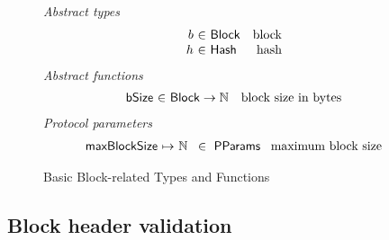 \documentclass[11pt,a4paper]{article}
\newcommand{\fun}[1]{\mathsf{#1}}
\newcommand{\type}[1]{\mathsf{#1}}
\newcommand{\totalf}{\to}
\newcommand{\partialf}{\mapsto}
\newcommand{\Hash}{\type{Hash}}  %
\newcommand{\Block}{\type{Block}}
\newcommand{\ProtParams}{\type{PParams}} %
\newcommand{\bsizename}{bSize}
\begin{document}
\begin{figure}[ht]
  \emph{Abstract types}
  \begin{equation*}
    \begin{array}{r@{~\in~}lr}
    b & \Block & \text{block} \\
    h & \Hash   & \text{hash} \\
    \end{array}
  \end{equation*}
  \emph{Abstract functions}
  \begin{equation*}
    \begin{array}{r@{~\in~}lr}
    \fun{\bsizename} & \Block \totalf \mathbb{N} & \text{block size in bytes} \\
    \end{array}
  \end{equation*}
  \emph{Protocol parameters}
  \begin{equation*}
    \begin{array}{r@{~\partialf~}l!{~\in~\ProtParams~}r}
    \maxblocksize & \mathbb{N} & \text{maximum block size} \\
    \end{array}
  \end{equation*}
  \caption{Basic Block-related Types and Functions}
  \label{fig:block-defs}
\end{figure}

\subsection{Block header validation}
\end{document}
